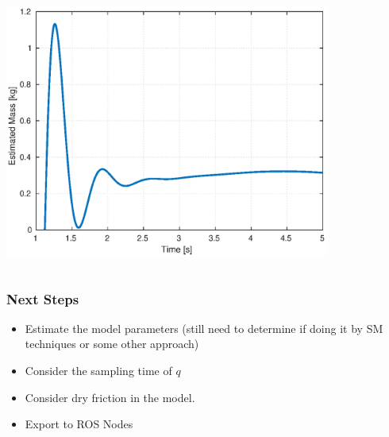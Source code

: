 \documentclass[9pt,spanish,aspectratio=1610]{beamer}
\begin{document}
\begin{frame}
\begin{columns}
\begin{column}{0.5\textwidth}
      \includegraphics[width=0.8\textwidth]{Figures/estimated_mass_zoom.eps}
    \end{column}
  \end{columns}
\end{frame}

\begin{frame}\frametitle{Next Steps}
\begin{itemize}
\item Estimate the model parameters (still need to determine if doing it by SM techniques or some other approach)
\item Consider the sampling time of $q$
\item Consider dry friction in the model.
\item Export to ROS Nodes
\end{itemize}  
\end{frame}
\end{document}

